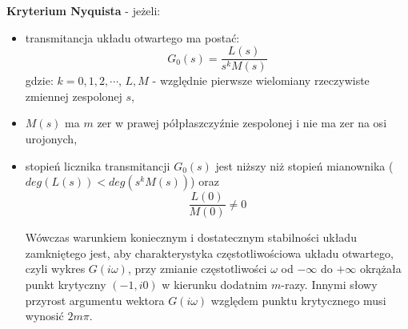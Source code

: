 \documentclass{article}
\begin{document}
    \textbf{Kryterium Nyquista} - jeżeli:
    \begin{itemize}
        \item transmitancja układu otwartego ma postać:
        $$
            G_{0}(s) = \frac{L(s)}{s^{k}M(s)}
        $$
        gdzie: $k = 0, 1, 2, \cdots$, $L, M$ - względnie pierwsze wielomiany rzeczywiste zmiennej zespolonej $s$,
        \item $M(s)$ ma $m$ zer w prawej półpłaszczyźnie zespolonej i nie ma zer na osi urojonych,
        \item stopień licznika transmitancji $G_{0}(s)$ jest niższy niż stopień mianownika ($deg(L(s)) < deg(s^{k}M(s))$)
        oraz
        $$
            \frac{L(0)}{M(0)} \neq 0
        $$

        Wówczas warunkiem koniecznym i dostatecznym stabilności układu zamkniętego jest, aby charakterystyka częstotliwościowa układu otwartego, czyli wykres $G(i\omega)$, przy zmianie częstotliwości $\omega$ od $-\infty$ do $+\infty$ okrążała punkt krytyczny $(-1, i0)$ w kierunku dodatnim $m$-razy.
        Innymi słowy przyrost argumentu wektora $G(i\omega)$ względem punktu krytycznego musi wynosić $2m\pi$.
    \end{itemize}
\end{document}
